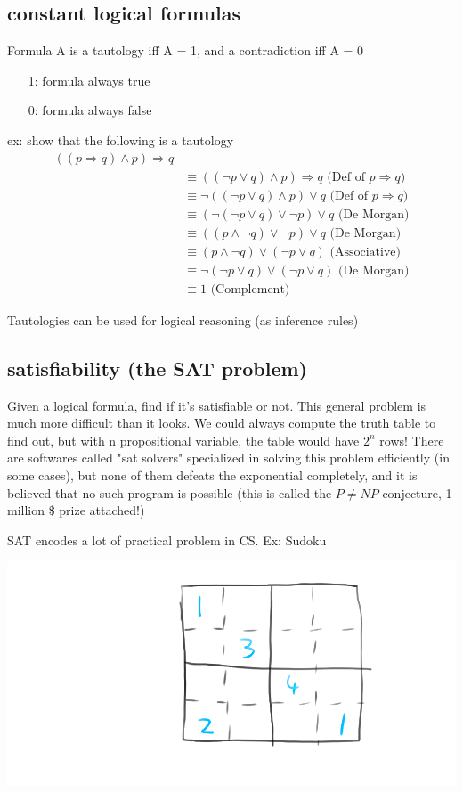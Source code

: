 \documentclass{article}
\begin{document}
\subsection{constant logical formulas}
Formula A is a tautology iff A = 1, and a contradiction iff A = 0
\begin{itemize}
    \item [1:] formula always true
    \item [0:] formula always false
\end{itemize}
ex: show that the following is a tautology
\begin{align*}
    ((p \Rightarrow  q) \land p) \Rightarrow q
    \\ & \equiv ((\lnot p \lor  q) \land p) \Rightarrow q \text{ (Def of $p \Rightarrow  q$)}
    \\ & \equiv \lnot ((\lnot p \lor  q) \land p) \lor q \text{ (Def of $p \Rightarrow  q$)}
    \\ & \equiv (\lnot(\lnot p \lor  q) \lor \lnot p) \lor q \text{ (De Morgan)}
    \\ & \equiv ((p \land \lnot q) \lor \lnot p) \lor q \text{ (De Morgan)}
    \\ & \equiv (p \land \lnot q) \lor (\lnot p \lor q) \text{ (Associative)}
    \\ & \equiv \lnot(\lnot p \lor q) \lor (\lnot p \lor q) \text{ (De Morgan)}
    \\ & \equiv 1 \text{ (Complement)}
\end{align*}

Tautologies can be used for logical reasoning (as inference rules)

\subsection{satisfiability (the SAT problem)}
Given a logical formula, find if it's satisfiable or not. This general problem is much more difficult than it looks. We could always compute the truth table to find out, but with n propositional variable, the table would have $2 ^{n}$ rows! There are softwares called "sat solvers" specialized in solving this problem efficiently (in some cases), but none of them defeats the exponential completely, and it is believed that no such program is possible (this is called the $P \neq NP$ conjecture, 1 million \$ prize attached!)

SAT encodes a lot of practical problem in CS. Ex: Sudoku

\includegraphics{l4_1}
\end{document}
